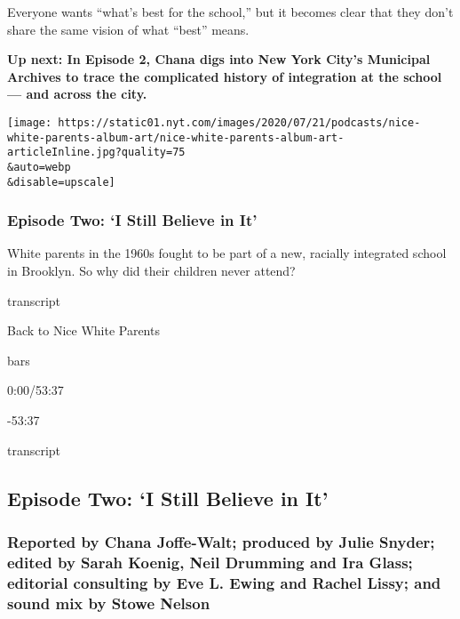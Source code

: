 Everyone wants ``what's best for the school,'' but it becomes clear that
they don't share the same vision of what ``best'' means.

\textbf{Up next: In Episode 2, Chana digs into New York City's Municipal
Archives to trace the complicated history of integration at the school
--- and across the city.}

\texttt{[image: https://static01.nyt.com/images/2020/07/21/podcasts/nice-white-parents-album-art/nice-white-parents-album-art-articleInline.jpg?quality=75\\\&auto=webp\\\&disable=upscale]}

\hypertarget{episode-two-i-still-believe-in-it}{%
\subsubsection{Episode Two: `I Still Believe in
It'}\label{episode-two-i-still-believe-in-it}}

White parents in the 1960s fought to be part of a new, racially
integrated school in Brooklyn. So why did their children never attend?

transcript

Back to Nice White Parents

bars

0:00/53:37

-53:37

transcript

\hypertarget{episode-two-i-still-believe-in-it-1}{%
\subsection{Episode Two: `I Still Believe in
It'}\label{episode-two-i-still-believe-in-it-1}}

\hypertarget{reported-by-chana-joffe-walt-produced-by-julie-snyder-edited-by-sarah-koenig-neil-drumming-and-ira-glass-editorial-consulting-by-eve-l-ewing-and-rachel-lissy-and-sound-mix-by-stowe-nelson-2}{%
\subsubsection{Reported by Chana Joffe-Walt; produced by Julie Snyder;
edited by Sarah Koenig, Neil Drumming and Ira Glass; editorial
consulting by Eve L. Ewing and Rachel Lissy; and sound mix by Stowe
Nelson}\label{reported-by-chana-joffe-walt-produced-by-julie-snyder-edited-by-sarah-koenig-neil-drumming-and-ira-glass-editorial-consulting-by-eve-l-ewing-and-rachel-lissy-and-sound-mix-by-stowe-nelson-2}}

